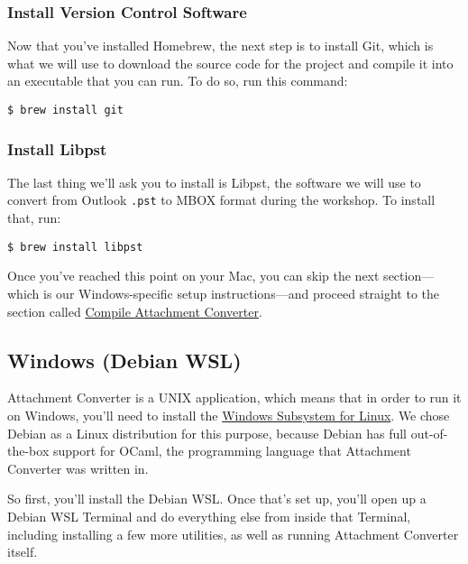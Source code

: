 \documentclass[11pt]{article}
\begin{document}
\normalsize

\subsubsection*{Install Version Control Software}
\label{sec:org7050c54}

Now that you've installed Homebrew, the next step is to install Git,
which is what we will use to download the source code for the project
and compile it into an executable that you can run.  To do so, run
this command:

\begin{verbatim}
$ brew install git
\end{verbatim}

\subsubsection*{Install Libpst}
\label{sec:orgf898f36}

The last thing we'll ask you to install is Libpst, the software we
will use to convert from Outlook \texttt{.pst} to MBOX format during the
workshop.  To install that, run:

\begin{verbatim}
$ brew install libpst
\end{verbatim}

Once you've reached this point on your Mac, you can skip the next
section---which is our Windows-specific setup instructions---and
proceed straight to the section called \hyperref[org336cbed]{Compile Attachment Converter}.

\subsection*{Windows (Debian WSL) \label{orga74c73d}}
\label{sec:orgec85940}

Attachment Converter is a UNIX application, which means that in order
to run it on Windows, you'll need to install the \href{https://en.wikipedia.org/wiki/Windows\_Subsystem\_for\_Linux}{Windows Subsystem for
Linux}.  We chose Debian as a Linux distribution for this purpose,
because Debian has full out-of-the-box support for OCaml, the
programming language that Attachment Converter was written in.

So first, you'll install the Debian WSL.  Once that's set up, you'll
open up a Debian WSL Terminal and do everything else from inside that
Terminal, including installing a few more utilities, as well as
running Attachment Converter itself.
\end{document}
